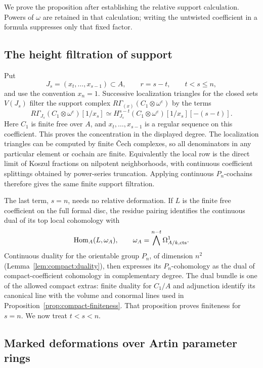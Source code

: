 We prove the proposition after establishing the relative support
calculation.  Powers of $\omega$ are retained in that calculation;
writing the untwisted coefficient in a formula suppresses only that
fixed factor.

\subsection{The height filtration of support}

Put
\[
 J_s=(x_t,\ldots,x_{s-1})\subset A,
 \qquad r=s-t,
 \qquad t<s\leq n,
\]
and use the convention $x_n=1$.  Successive localization triangles for
the closed sets $V(J_s)$ filter the support complex
$R\Gamma_{(x)}(C_1\otimes\omega^e)$ by the terms
\begin{equation}
 \label{eq:boundary-support-rows}
 R\Gamma_{J_s}(C_1\otimes\omega^e)[1/x_s]
 \simeq
 H^{s-t}_{J_s}(C_1\otimes\omega^e)[1/x_s][-(s-t)].
\end{equation}
Here $C_1$ is finite free over $A$, and $x_t,\ldots,x_{s-1}$ is a
regular sequence on this coefficient.  This proves the concentration
in the displayed degree.  The localization triangles can be computed
by finite \v{C}ech complexes, so all denominators in any particular
element or cochain are finite.  Equivalently the local row is the
direct limit of Koszul fractions on nilpotent neighborhoods, with
continuous coefficient splittings obtained by power-series
truncation.  Applying continuous $P_n$-cochains therefore gives the
same finite support filtration.

The last term, $s=n$, needs no relative deformation.  If $L$ is the
finite free coefficient on the full formal disc, the residue pairing
identifies the continuous dual of its top local cohomology with
\[
 \operatorname{Hom}_A(L,\omega_A),
 \qquad
 \omega_A=\bigwedge^{n-t}\Omega^1_{A/k,\mathrm{cts}}.
\]
Continuous duality for the orientable group $P_n$, of dimension $n^2$
(Lemma~\ref{lem:compact:duality}),
then expresses its $P_n$-cohomology as the dual of compact-coefficient
cohomology in complementary degree.  The dual bundle is one of the
allowed compact extras: finite duality for $C_1/A$ and adjunction
identify its canonical line with the volume and conormal lines used
in Proposition~\ref{prop:compact-finiteness}.  That proposition proves
finiteness for $s=n$.  We now treat $t<s<n$.

\subsection{Marked deformations over Artin parameter rings}

